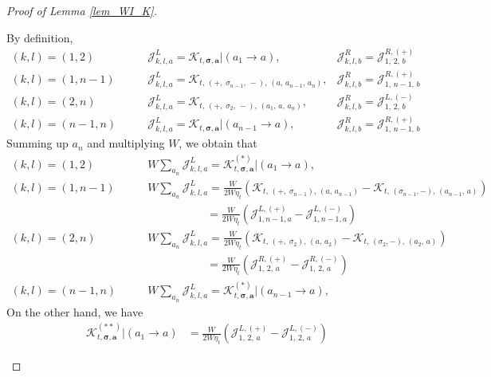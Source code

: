\documentclass[10pt,a4paper]{amsart}
\newcommand{\cal}{\mathcal}
\begin{document}
\begin{proof}[Proof of Lemma \ref{lem_WI_K}]
\begin{itemize}
By definition,  
\begin{align} 
 (k,l)=(1,2) \quad &\quad   {\cal J}^L_{k,l,a}  ={\cal K}_{t, \boldsymbol{\sigma}, \textbf{a}}\Bigg|(a_1\to a) ,  
 &{\cal J}^R_{k,l,b}=  {\cal J}^{R,(+)}_{1,\,2,\,b}\quad 
 \\\nonumber
 (k,l)=(1,n-1)\quad &\quad {\cal J}^L_{k,l,a}  =
 {\cal K}_{t, \,(+,\;\sigma_{n-1},\,-),\, (a,\,a_{n-1},\,a_n)},  
 &{\cal J}^R_{k,l,b}=  {\cal J}^{R,(+)}_{1,\,{n-1},\,b}
  \\\nonumber
 (k,l)=(2,n)  \quad &\quad  {\cal J}^L_{k,l,a}  =
 {\cal K}_{t, \,(+,\;\sigma_{2},\,-),\, (a_1,\,a,\,a_n)} ,  
 &{\cal J}^R_{k,l,b}=  {\cal J}^{L,(-)}_{1,\,2,\,b}\quad 
 \\\nonumber
 (k,l)=(n-1,n)\quad &\quad {\cal J}^L_{k,l,a}  ={\cal K}_{t, \boldsymbol{\sigma}, \textbf{a}}\Bigg|(a_{n-1}\to a), 
 &{\cal J}^R_{k,l,b}=  {\cal J}^{R,(+)}_{1,\,{n-1},\,b}
\end{align}
 Summing  up $a_n$ and multiplying  $W$,  we obtain that
 \begin{align} 
 (k,l)=(1,2) \quad &\quad  W\sum_{a_n} {\cal J}^L_{k,l,a}  ={\cal K}^{(*)}_{t, \boldsymbol{\sigma}, \textbf{a}}\Bigg|(a_1\to a) ,  
   \\\nonumber
 (k,l)=(1,n-1)\quad &\quad W \sum_{a_n}{\cal J}^L_{k,l,a}  =
 \frac{W}{2W\eta_t} 
 \left({\cal K}_{t, \,(+,\;\sigma_{n-1}),\, (a,\,a_{n-1} )} 
 - {\cal K}_{t, \,( \sigma_{n-1},-),\, ( a_{n-1}, \, a )}  \right)
 \\\nonumber
 & \quad \quad \quad\quad \quad \quad\;=  \frac{W}{2W\eta_t} 
 \left({\cal J}^{L, (+)}_{1,n-1,a} 
 - {\cal J}^{L, (-)}_{1,n-1,a} \right)
   \\\nonumber
 (k,l)=(2,n)  \quad &\quad  W\sum_{a_n} {\cal J}^L_{k,l,a}  =
\frac{W}{2W\eta_t} 
 \left({\cal K}_{t, \,(+,\;\sigma_{2}),\, (a,\,a_{2} )} 
 - {\cal K}_{t, \,( \sigma_{2},-),\, ( a_{2}, \, a )}  \right)
 \\\nonumber
 & \quad \quad \quad\quad \quad \quad\;=  \frac{W}{2W\eta_t} 
 \left({\cal J}^{R, (+)}_{1,\,2,\,a} 
 - {\cal J}^{R, (-)}_{1,\,2,\,a} \right)  \\\nonumber
 (k,l)=(n-1,n)\quad &\quad  W\sum_{a_n}{\cal J}^L_{k,l,a}  ={\cal K}^{(*)}_{t, \boldsymbol{\sigma}, \textbf{a}}\Bigg|(a_{n-1}\to a), 
 \end{align}
  On the other hand, we have 
  \begin{align}
      {\cal K}^{(**)}_{t, \boldsymbol{\sigma}, \textbf{a}}\Bigg|(a_1\to a) 
      & = \frac{W}{2W\eta_t}
      \left({\cal J}^{L, (+)}_{1,\,2,\,a}-{\cal J}^{L, (-)}_{1,\,2,\,a}\right)

\end{align}
\end{itemize}
\end{proof}
\end{document}
